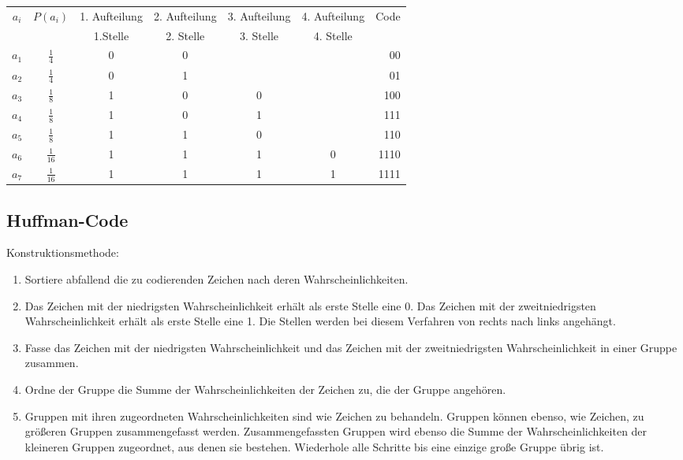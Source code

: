 \begin{center}
\begin{tabular}{cc*{4}{c}r}
	$a_i$ & $P(a_i)$       & 1. Aufteilung & 2. Aufteilung & 3. Aufteilung & 4. Aufteilung & Code \\
	      &                & 1.Stelle      & 2. Stelle     & 3. Stelle     & 4. Stelle     &      \\
	$a_1$ & $\frac{1}{4}$  & 0             & 0             &               &               & 00   \\
	$a_2$ & $\frac{1}{4}$  & 0             & 1             &               &               & 01   \\
	$a_3$ & $\frac{1}{8}$  & 1             & 0             & 0             &               & 100  \\
	$a_4$ & $\frac{1}{8}$  & 1             & 0             & 1             &               & 111  \\
	$a_5$ & $\frac{1}{8}$  & 1             & 1             & 0             &               & 110  \\
	$a_6$ & $\frac{1}{16}$ & 1             & 1             & 1             & 0             & 1110 \\
	$a_7$ & $\frac{1}{16}$ & 1             & 1             & 1             & 1             & 1111 \\
\end{tabular}
\end{center}

\subsection{Huffman-Code}
Konstruktionsmethode:
\begin{enumerate}
  \item Sortiere abfallend die zu codierenden Zeichen nach deren Wahrscheinlichkeiten.
  \item Das Zeichen mit der niedrigsten Wahrscheinlichkeit erhält als erste Stelle eine 0. Das Zeichen mit der zweitniedrigsten Wahrscheinlichkeit erhält als erste Stelle eine 1. Die Stellen werden bei diesem Verfahren von rechts nach links angehängt.
  \item Fasse das Zeichen mit der niedrigsten Wahrscheinlichkeit und das Zeichen mit der zweitniedrigsten Wahrscheinlichkeit in einer Gruppe zusammen.
  \item Ordne der Gruppe die Summe der Wahrscheinlichkeiten der Zeichen zu, die der Gruppe angehören.
  \item Gruppen mit ihren zugeordneten Wahrscheinlichkeiten sind wie Zeichen zu behandeln.
	Gruppen können ebenso, wie Zeichen, zu größeren Gruppen zusammengefasst werden. 
	Zusammengefassten Gruppen wird ebenso die Summe der Wahrscheinlichkeiten der kleineren Gruppen zugeordnet, aus denen sie bestehen.
	Wiederhole alle Schritte bis eine einzige große Gruppe übrig ist.
\end{enumerate}

